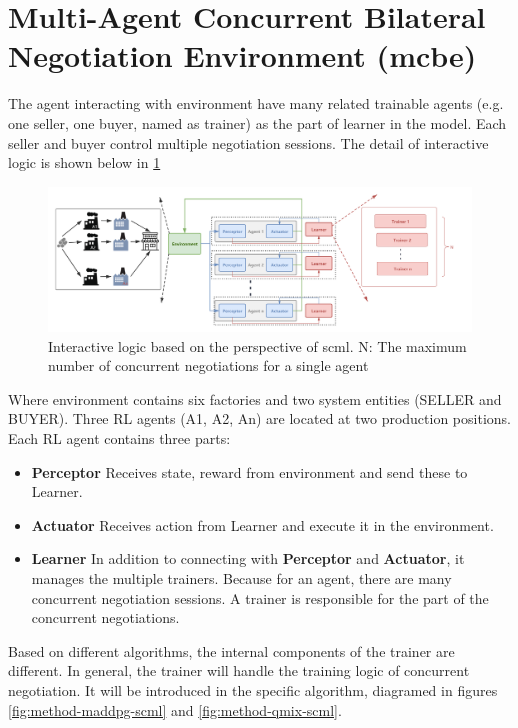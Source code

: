 \section{Multi-Agent Concurrent Bilateral Negotiation Environment (\gls{mcbe})} 
The agent interacting with environment have many related trainable agents (e.g. one seller, one buyer, named as trainer) as the part of learner in the model. Each seller and buyer control multiple negotiation sessions. The detail of interactive logic is shown below in \ref{fig:interacting-logic-scml}

\begin{figure}[htbp]
\centering
\includegraphics[width=1.0\textwidth]{./images/scnk.png}
\caption{Interactive logic based on the perspective of \gls{scml}. N: The maximum number of concurrent negotiations for a single agent}
\label{fig:interacting-logic-scml}
\end{figure}

Where environment contains six factories and two system entities (SELLER and BUYER). Three RL agents (A1, A2, An) are located at two production positions. Each RL agent contains three parts:

\begin{itemize}
\item \textbf{Perceptor} Receives state, reward from environment and send these to Learner.
\item \textbf{Actuator} Receives action from Learner and execute it in the environment.
\item \textbf{Learner} In addition to connecting with \textbf{Perceptor} and \textbf{Actuator}, it manages the multiple trainers. Because for an agent, there are many concurrent negotiation sessions. A trainer is responsible for the part of the concurrent negotiations.
\end{itemize}

Based on different algorithms, the internal components of the trainer are different. In general, the trainer will handle the training logic of concurrent negotiation. It will be introduced in the specific algorithm, diagramed in figures \ref{fig:method-maddpg-scml} and \ref{fig:method-qmix-scml}.

